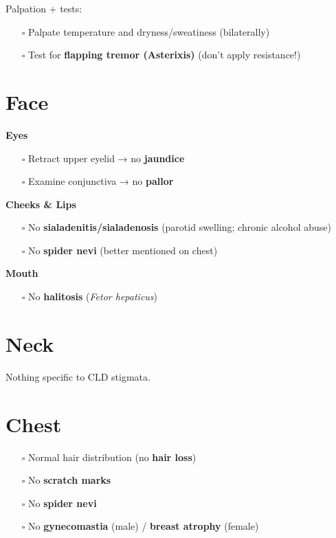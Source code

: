 \documentclass[
  13.5pt,
  a4paper,
  DIV=11,
  numbers=noendperiod]{scrreprt}
\providecommand{\tightlist}{%
  \setlength{\itemsep}{0pt}\setlength{\parskip}{0pt}}
\begin{document}
Palpation + tests:

\begin{itemize}
\tightlist
\item[$\square$]
  Palpate temperature and dryness/sweatiness (bilaterally)
\item[$\square$]
  Test for \textbf{flapping tremor (Asterixis)} (don't apply
  resistance!)
\end{itemize}

\section{Face}\label{face-2}

\textbf{Eyes}

\begin{itemize}
\tightlist
\item[$\square$]
  Retract upper eyelid → no \textbf{jaundice}
\item[$\square$]
  Examine conjunctiva → no \textbf{pallor}
\end{itemize}

\textbf{Cheeks \& Lips}

\begin{itemize}
\tightlist
\item[$\square$]
  No \textbf{sialadenitis/sialadenosis} (parotid swelling; chronic
  alcohol abuse)
\item[$\square$]
  No \textbf{spider nevi} (better mentioned on chest)
\end{itemize}

\textbf{Mouth}

\begin{itemize}
\tightlist
\item[$\square$]
  No \textbf{halitosis} (\emph{Fetor hepaticus})
\end{itemize}

\section{Neck}\label{neck-1}

Nothing specific to CLD stigmata.

\section{Chest}\label{chest-1}

\begin{itemize}
\tightlist
\item[$\square$]
  Normal hair distribution (no \textbf{hair loss})
\item[$\square$]
  No \textbf{scratch marks}
\item[$\square$]
  No \textbf{spider nevi}
\item[$\square$]
  No \textbf{gynecomastia} (male) / \textbf{breast atrophy} (female)
\end{itemize}
\end{document}
